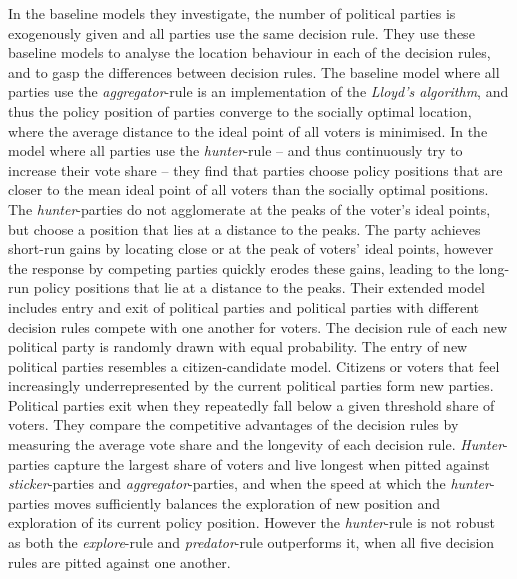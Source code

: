 \documentclass[preprint, 12pt]{elsarticle}
\begin{document}
In the baseline models they investigate, the number of political parties is exogenously given and all parties use the same decision rule. They use these baseline models to analyse the location behaviour in each of the decision rules, and to gasp the differences between decision rules. The baseline model where all parties use the \emph{aggregator}-rule is an implementation of the \emph{Lloyd's algorithm}, and thus the policy position of parties converge to the socially optimal location, where the average distance to the ideal point of all voters is minimised. In the model where all parties use the \emph{hunter}-rule -- and thus continuously try to increase their vote share -- they find that parties choose policy positions that are closer to the mean ideal point of all voters than the socially optimal positions. The \emph{hunter}-parties do not agglomerate at the peaks of the voter's ideal points, but choose a position that lies at a distance to the peaks. The party achieves short-run gains by locating close or at the peak of voters' ideal points, however the response by competing parties quickly erodes these gains, leading to the long-run policy positions that lie at a distance to the peaks. Their extended model includes entry and exit of political parties and political parties with different decision rules compete with one another for voters. The decision rule of each new political party is randomly drawn with equal probability. The entry of new political parties resembles a citizen-candidate model. Citizens or voters that feel increasingly underrepresented by the current political parties form new parties. Political parties exit when they repeatedly fall below a given threshold share of voters. They compare the competitive advantages of the decision rules by measuring the average vote share and the longevity of each decision rule. \emph{Hunter}-parties capture the largest share of voters and live longest when pitted against \emph{sticker}-parties and \emph{aggregator}-parties, and when the speed at which the \emph{hunter}-parties moves sufficiently balances the exploration of new position and exploration of its current policy position. However the \emph{hunter}-rule is not robust as both the \emph{explore}-rule and \emph{predator}-rule outperforms it, when all five decision rules are pitted against one another. 
\end{document}
